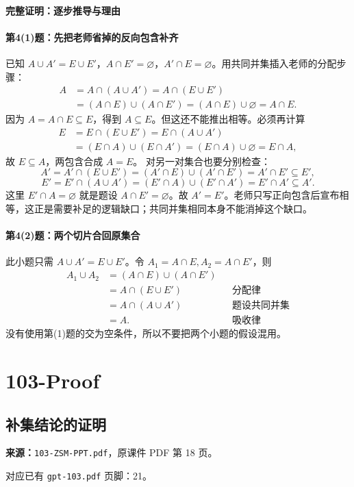 \paragraph{完整证明：逐步推导与理由}

\paragraph{第4(1)题：先把老师省掉的反向包含补齐}
已知 $A\cup A'=E\cup E'$，$A\cap E'=\varnothing$，$A'\cap E=\varnothing$。用共同并集插入老师的分配步骤：
\begin{align*}
A&=A\cap(A\cup A')=A\cap(E\cup E')\\
&=(A\cap E)\cup(A\cap E')=(A\cap E)\cup\varnothing=A\cap E.
\end{align*}
因为 $A=A\cap E\subseteq E$，得到 $A\subseteq E$。但这还不能推出相等。必须再计算
\begin{align*}
E&=E\cap(E\cup E')=E\cap(A\cup A')\\
&=(E\cap A)\cup(E\cap A')=(E\cap A)\cup\varnothing=E\cap A,
\end{align*}
故 $E\subseteq A$，两包含合成 $A=E$。
对另一对集合也要分别检查：
\[A'=A'\cap(E\cup E')=(A'\cap E)\cup(A'\cap E')=A'\cap E'\subseteq E',\]
\[E'=E'\cap(A\cup A')=(E'\cap A)\cup(E'\cap A')=E'\cap A'\subseteq A'.\]
这里 $E'\cap A=\varnothing$ 就是题设 $A\cap E'=\varnothing$。故 $A'=E'$。老师只写正向包含后宣布相等，这正是需要补足的逻辑缺口；共同并集相同本身不能消掉这个缺口。
\paragraph{第4(2)题：两个切片合回原集合}
此小题只需 $A\cup A'=E\cup E'$。令 $A_1=A\cap E,A_2=A\cap E'$，则
\begin{align*}
A_1\cup A_2&=(A\cap E)\cup(A\cap E')\\
&=A\cap(E\cup E')&&\text{分配律}\\
&=A\cap(A\cup A')&&\text{题设共同并集}\\
&=A.&&\text{吸收律}
\end{align*}
没有使用第(1)题的交为空条件，所以不要把两个小题的假设混用。

\clearpage\section{103-Proof}
\clearpage\subsection{补集结论的证明}
\textbf{来源：}\texttt{103-ZSM-PPT.pdf}，原课件 PDF 第 18 页。\par
对应已有 \texttt{gpt-103.pdf} 页脚：21。\par
